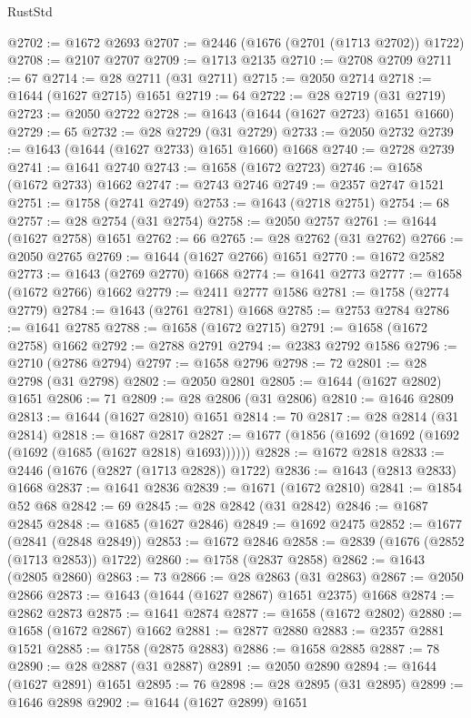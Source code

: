 \begin{lexlean}{RustStd}
\begin{coremodule}
@2702 := @1672 @2693
@2707 := @2446 (@1676 (@2701 (@1713 @2702)) @1722)
@2708 := @2107 @2707
@2709 := @1713 @2135
@2710 := @2708 @2709
@2711 := 67
@2714 := @28 @2711 (@31 @2711)
@2715 := @2050 @2714
@2718 := @1644 (@1627 @2715) @1651
@2719 := 64
@2722 := @28 @2719 (@31 @2719)
@2723 := @2050 @2722
@2728 := @1643 (@1644 (@1627 @2723) @1651 @1660)
@2729 := 65
@2732 := @28 @2729 (@31 @2729)
@2733 := @2050 @2732
@2739 := @1643 (@1644 (@1627 @2733) @1651 @1660) @1668
@2740 := @2728 @2739
@2741 := @1641 @2740
@2743 := @1658 (@1672 @2723)
@2746 := @1658 (@1672 @2733) @1662
@2747 := @2743 @2746
@2749 := @2357 @2747 @1521
@2751 := @1758 (@2741 @2749)
@2753 := @1643 (@2718 @2751)
@2754 := 68
@2757 := @28 @2754 (@31 @2754)
@2758 := @2050 @2757
@2761 := @1644 (@1627 @2758) @1651
@2762 := 66
@2765 := @28 @2762 (@31 @2762)
@2766 := @2050 @2765
@2769 := @1644 (@1627 @2766) @1651
@2770 := @1672 @2582
@2773 := @1643 (@2769 @2770) @1668
@2774 := @1641 @2773
@2777 := @1658 (@1672 @2766) @1662
@2779 := @2411 @2777 @1586
@2781 := @1758 (@2774 @2779)
@2784 := @1643 (@2761 @2781) @1668
@2785 := @2753 @2784
@2786 := @1641 @2785
@2788 := @1658 (@1672 @2715)
@2791 := @1658 (@1672 @2758) @1662
@2792 := @2788 @2791
@2794 := @2383 @2792 @1586
@2796 := @2710 (@2786 @2794)
@2797 := @1658 @2796
@2798 := 72
@2801 := @28 @2798 (@31 @2798)
@2802 := @2050 @2801
@2805 := @1644 (@1627 @2802) @1651
@2806 := 71
@2809 := @28 @2806 (@31 @2806)
@2810 := @1646 @2809
@2813 := @1644 (@1627 @2810) @1651
@2814 := 70
@2817 := @28 @2814 (@31 @2814)
@2818 := @1687 @2817
@2827 := @1677 (@1856 (@1692 (@1692 (@1692 (@1692 (@1685 (@1627 @2818) @1693))))))
@2828 := @1672 @2818
@2833 := @2446 (@1676 (@2827 (@1713 @2828)) @1722)
@2836 := @1643 (@2813 @2833) @1668
@2837 := @1641 @2836
@2839 := @1671 (@1672 @2810)
@2841 := @1854 @52 @68
@2842 := 69
@2845 := @28 @2842 (@31 @2842)
@2846 := @1687 @2845
@2848 := @1685 (@1627 @2846)
@2849 := @1692 @2475
@2852 := @1677 (@2841 (@2848 @2849))
@2853 := @1672 @2846
@2858 := @2839 (@1676 (@2852 (@1713 @2853)) @1722)
@2860 := @1758 (@2837 @2858)
@2862 := @1643 (@2805 @2860)
@2863 := 73
@2866 := @28 @2863 (@31 @2863)
@2867 := @2050 @2866
@2873 := @1643 (@1644 (@1627 @2867) @1651 @2375) @1668
@2874 := @2862 @2873
@2875 := @1641 @2874
@2877 := @1658 (@1672 @2802)
@2880 := @1658 (@1672 @2867) @1662
@2881 := @2877 @2880
@2883 := @2357 @2881 @1521
@2885 := @1758 (@2875 @2883)
@2886 := @1658 @2885
@2887 := 78
@2890 := @28 @2887 (@31 @2887)
@2891 := @2050 @2890
@2894 := @1644 (@1627 @2891) @1651
@2895 := 76
@2898 := @28 @2895 (@31 @2895)
@2899 := @1646 @2898
@2902 := @1644 (@1627 @2899) @1651

\end{coremodule}
\end{lexlean}
